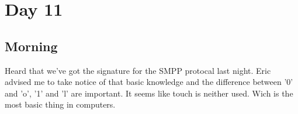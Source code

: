 \section{Day 11}
\subsection{Morning}
Heard that we've got the signature for the SMPP protocal last night.
Eric advised me to take notice of that basic knowledge and the difference between '0' and 'o', '1' and 'l' are important. It seems like touch is neither used. Wich is the most basic thing in computers.